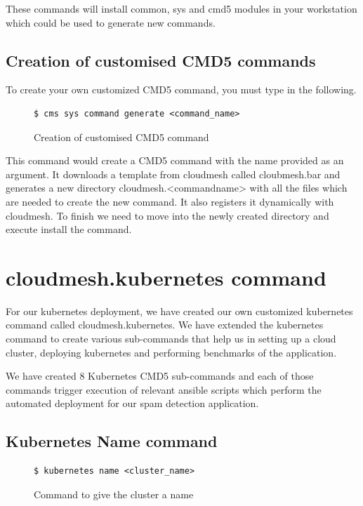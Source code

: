 \documentclass[9pt,twocolumn,twoside]{../../styles/osajnl}
\begin{document}
These commands will install common, sys and cmd5 modules in your
workstation which could be used to generate new commands.

\subsection{Creation of customised CMD5 commands}
To create your own customized CMD5 command, you must type in the
following.

\begin{figure}[H]
\begin{verbatim}
$ cms sys command generate <command_name>
\end{verbatim}
\caption{Creation of customised CMD5 command}
\label{Creation of customised CMD5 command}
\end{figure}


\noindent
This command would create a CMD5 command with the name provided as an
argument. It downloads a template from cloudmesh called cloubmesh.bar
and generates a new directory cloudmesh.<command\textunderscore name>
with all the files which are needed to create the new command. It also
registers it dynamically with cloudmesh. To finish we need to move
into the newly created directory and execute install the command.

\section{cloudmesh.kubernetes command}
For our kubernetes deployment, we have
created our own customized kubernetes command called
cloudmesh.kubernetes. We have extended the kubernetes command to
create various sub-commands that help us in setting up a cloud cluster,
deploying kubernetes and performing benchmarks of the application.

\noindent
We have created 8 Kubernetes CMD5 sub-commands and each of those
commands trigger execution of relevant ansible scripts which perform
the automated deployment for our spam detection application.\newline

\subsection{Kubernetes Name command}
\begin{figure}[H]
\begin{verbatim}
$ kubernetes name <cluster_name>
\end{verbatim}
\caption{Command to give the cluster a name}
\vspace{-4mm}
\label{Command to given the cluster a name}
\end{figure}
\end{document}

